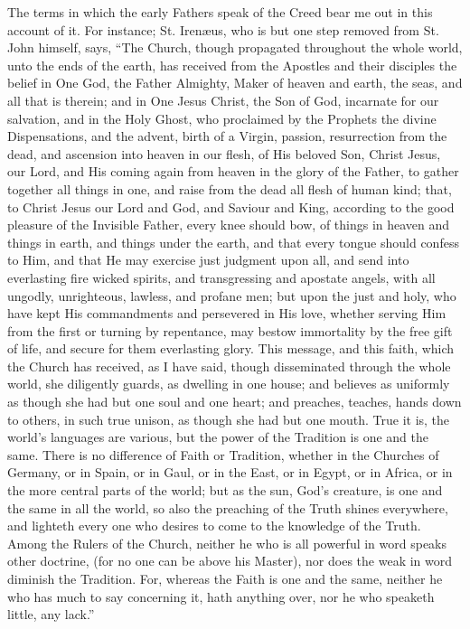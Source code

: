 The terms in which the early Fathers speak of the Creed bear me out
in this account of it. For instance; St. Irenæus, who is but one step
removed from St. John himself, says, ``The Church, though
propagated throughout the whole world, unto the ends of the earth, has
received from the Apostles and their disciples the belief in One God,
the Father Almighty, Maker of heaven and earth, the seas, and all that
is therein; and in One Jesus Christ, the Son of God, incarnate for our
salvation, and in the Holy Ghost, who proclaimed by the Prophets the
divine Dispensations, and the advent, birth of a Virgin, passion,
resurrection from the dead, and ascension into heaven in our flesh, of
His beloved Son, Christ Jesus, our Lord, and His coming again from
heaven in the glory of the Father, to gather together all things in
one, and raise from the dead all flesh of human kind; that, to Christ
Jesus our Lord and God, and Saviour and King, according to the good
pleasure of the Invisible Father, every knee should bow, of things in
heaven and things in earth, and things under the earth, and that every
tongue should confess to Him, and that He may exercise just
judgment upon all, and send into everlasting fire wicked spirits, and
transgressing and apostate angels, with all ungodly, unrighteous,
lawless, and profane men; but upon the just and holy, who have kept
His commandments and persevered in His love, whether serving Him from
the first or turning by repentance, may bestow immortality by the free
gift of life, and secure for them everlasting glory. This message, and
this faith, which the Church has received, as I have said, though
disseminated through the whole world, she diligently guards, as
dwelling in one house; and believes as uniformly as though she had but
one soul and one heart; and preaches, teaches, hands down to others,
in such true unison, as though she had but one mouth. True it is, the
world's languages are various, but the power of the Tradition is one
and the same. There is no difference of Faith or Tradition, whether in
the Churches of Germany, or in Spain, or in Gaul, or in the East, or
in Egypt, or in Africa, or in the more central parts of the world; but
as the sun, God's creature, is one and the same in all the world, so
also the preaching of the Truth shines everywhere, and lighteth every
one who desires to come to the knowledge of the Truth. Among the
Rulers of the Church, neither he who is all powerful in word speaks
other doctrine, (for no one can be above his Master), nor does the
weak in word diminish the Tradition. For, whereas the Faith is one and
the same, neither he who has much to say concerning it, hath anything
over, nor he who speaketh little, any lack.''

